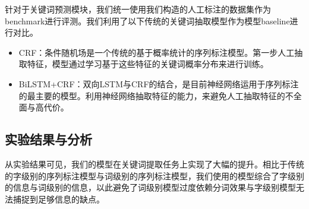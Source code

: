 针对于关键词预测模块，我们统一使用我们构造的人工标注的数据集作为benchmark进行评测。我们利用了以下传统的关键词抽取模型作为模型baseline进行对比。

\begin{itemize}
	\item CRF：条件随机场是一个传统的基于概率统计的序列标注模型。第一步人工抽取特征，模型通过学习基于这些特征的关键词概率分布来进行训练。
	\item BiLSTM+CRF：双向LSTM与CRF的结合，是目前神经网络运用于序列标注的最主要的模型。利用神经网络抽取特征的能力，来避免人工抽取特征的不全面与高代价。
\end{itemize}

\subsection{实验结果与分析}

从实验结果可见，我们的模型在关键词提取任务上实现了大幅的提升。相比于传统的字级别的序列标注模型与词级别的序列标注模型，我们使用的模型综合了字级别的信息与词级别的信息，以此避免了词级别模型过度依赖分词效果与字级别模型无法捕捉到足够信息的缺点。



